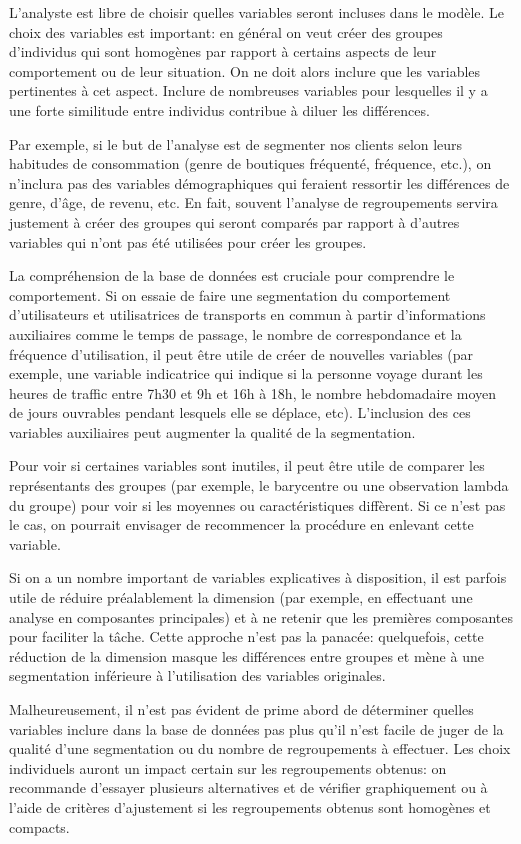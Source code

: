 \documentclass[
  11pt,
  letterpaper,
]{book}
\theoremstyle{definition}
\theoremstyle{remark}
\begin{document}
L'analyste est libre de choisir quelles variables seront incluses dans
le modèle. Le choix des variables est important: en général on veut
créer des groupes d'individus qui sont homogènes par rapport à certains
aspects de leur comportement ou de leur situation. On ne doit alors
inclure que les variables pertinentes à cet aspect. Inclure de
nombreuses variables pour lesquelles il y a une forte similitude entre
individus contribue à diluer les différences.

Par exemple, si le but de l'analyse est de segmenter nos clients selon
leurs habitudes de consommation (genre de boutiques fréquenté,
fréquence, etc.), on n'inclura pas des variables démographiques qui
feraient ressortir les différences de genre, d'âge, de revenu, etc. En
fait, souvent l'analyse de regroupements servira justement à créer des
groupes qui seront comparés par rapport à d'autres variables qui n'ont
pas été utilisées pour créer les groupes.

La compréhension de la base de données est cruciale pour comprendre le
comportement. Si on essaie de faire une segmentation du comportement
d'utilisateurs et utilisatrices de transports en commun à partir
d'informations auxiliaires comme le temps de passage, le nombre de
correspondance et la fréquence d'utilisation, il peut être utile de
créer de nouvelles variables (par exemple, une variable indicatrice qui
indique si la personne voyage durant les heures de traffic entre 7h30 et
9h et 16h à 18h, le nombre hebdomadaire moyen de jours ouvrables pendant
lesquels elle se déplace, etc). L'inclusion des ces variables
auxiliaires peut augmenter la qualité de la segmentation.

Pour voir si certaines variables sont inutiles, il peut être utile de
comparer les représentants des groupes (par exemple, le barycentre ou
une observation lambda du groupe) pour voir si les moyennes ou
caractéristiques diffèrent. Si ce n'est pas le cas, on pourrait
envisager de recommencer la procédure en enlevant cette variable.

Si on a un nombre important de variables explicatives à disposition, il
est parfois utile de réduire préalablement la dimension (par exemple, en
effectuant une analyse en composantes principales) et à ne retenir que
les premières composantes pour faciliter la tâche. Cette approche n'est
pas la panacée: quelquefois, cette réduction de la dimension masque les
différences entre groupes et mène à une segmentation inférieure à
l'utilisation des variables originales.

Malheureusement, il n'est pas évident de prime abord de déterminer
quelles variables inclure dans la base de données pas plus qu'il n'est
facile de juger de la qualité d'une segmentation ou du nombre de
regroupements à effectuer. Les choix individuels auront un impact
certain sur les regroupements obtenus: on recommande d'essayer plusieurs
alternatives et de vérifier graphiquement ou à l'aide de critères
d'ajustement si les regroupements obtenus sont homogènes et compacts.
\end{document}
